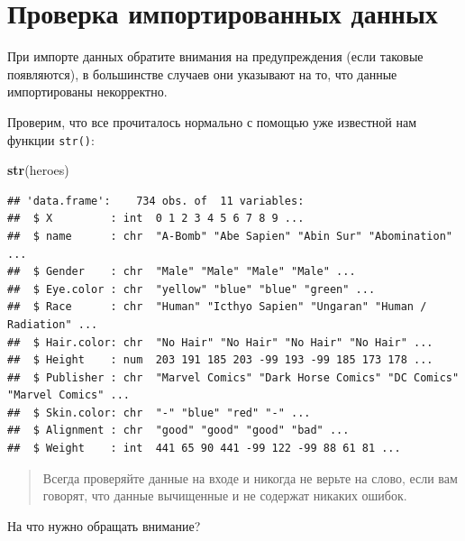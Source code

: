\documentclass[
]{book}
\newenvironment{Shaded}{\begin{snugshade}}{\end{snugshade}}
\newcommand{\KeywordTok}[1]{\textcolor[rgb]{0.13,0.29,0.53}{\textbf{#1}}}
\newcommand{\NormalTok}[1]{#1}
\begin{document}
\hypertarget{ux43fux440ux43eux432ux435ux440ux43aux430-ux438ux43cux43fux43eux440ux442ux438ux440ux43eux432ux430ux43dux43dux44bux445-ux434ux430ux43dux43dux44bux445}{%
\section{Проверка импортированных данных}\label{ux43fux440ux43eux432ux435ux440ux43aux430-ux438ux43cux43fux43eux440ux442ux438ux440ux43eux432ux430ux43dux43dux44bux445-ux434ux430ux43dux43dux44bux445}}

При импорте данных обратите внимания на предупреждения (если таковые появляются), в большинстве случаев они указывают на то, что данные импортированы некорректно.

Проверим, что все прочиталось нормально с помощью уже известной нам функции \texttt{str()}:

\begin{Shaded}
\begin{Highlighting}[]
\KeywordTok{str}\NormalTok{(heroes)}
\end{Highlighting}
\end{Shaded}

\begin{verbatim}
## 'data.frame':    734 obs. of  11 variables:
##  $ X         : int  0 1 2 3 4 5 6 7 8 9 ...
##  $ name      : chr  "A-Bomb" "Abe Sapien" "Abin Sur" "Abomination" ...
##  $ Gender    : chr  "Male" "Male" "Male" "Male" ...
##  $ Eye.color : chr  "yellow" "blue" "blue" "green" ...
##  $ Race      : chr  "Human" "Icthyo Sapien" "Ungaran" "Human / Radiation" ...
##  $ Hair.color: chr  "No Hair" "No Hair" "No Hair" "No Hair" ...
##  $ Height    : num  203 191 185 203 -99 193 -99 185 173 178 ...
##  $ Publisher : chr  "Marvel Comics" "Dark Horse Comics" "DC Comics" "Marvel Comics" ...
##  $ Skin.color: chr  "-" "blue" "red" "-" ...
##  $ Alignment : chr  "good" "good" "good" "bad" ...
##  $ Weight    : int  441 65 90 441 -99 122 -99 88 61 81 ...
\end{verbatim}

\begin{quote}
Всегда проверяйте данные на входе и никогда не верьте на слово, если вам говорят, что данные вычищенные и не содержат никаких ошибок.
\end{quote}

На что нужно обращать внимание?
\end{document}
